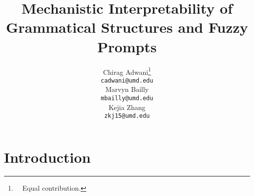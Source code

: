 \documentclass[11pt,a4paper]{article}
\title{Mechanistic Interpretability of Grammatical Structures and Fuzzy Prompts}
\author{
  Chirag Adwani\thanks{\vspace{4mm}~~Equal contribution.} \\
  {\tt cadwani@umd.edu} \\
  \And
  Marvyn Bailly\footnotemark[1] \\
  {\tt mbailly@umd.edu} \\
  \And
  Kejia Zhang\footnotemark[1] \\
  {\tt zkj15@umd.edu}
}
\date{}
\newcommand{\blue}{\color{black}{}}
\begin{document}
\maketitle

\section{Introduction}


\end{document}
